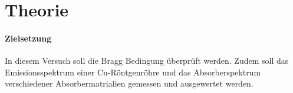 \section{Theorie}
\label{sec:Theorie}

\paragraph{Zielsetzung}
In diesem Versuch soll die Bragg Bedingung überprüft werden. Zudem soll das
Emissionsspektrum einer Cu-Röntgenröhre und das Absorberspektrum verschiedener
Absorbermatrialien gemessen und ausgewertet werden.
